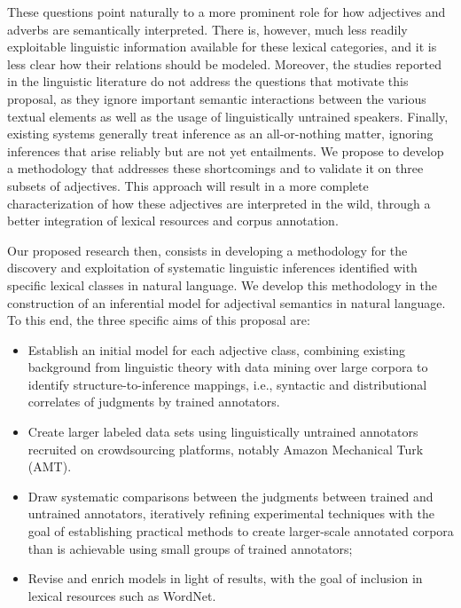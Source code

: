 \documentclass[10pt]{article}
\newcommand{\moveup}{\vspace*{-1.8mm}}
\begin{document}
These questions point naturally to a more prominent role for how adjectives and adverbs are semantically interpreted. There is, however, much less readily exploitable linguistic information available for these lexical categories, and it is less clear how their relations should be modeled. 
Moreover, the studies reported in the linguistic literature do not address the questions that motivate this proposal, as they ignore important semantic interactions 
between the various textual elements as well as the usage of linguistically untrained  speakers. 
Finally, existing systems generally treat inference as an all-or-nothing matter, ignoring inferences that arise reliably but are not yet entailments.
We propose to develop a methodology that addresses these shortcomings and to validate it on three subsets of adjectives.
This approach will result in a more complete characterization of how  these adjectives are interpreted in the wild, through a better integration of lexical resources   and corpus annotation. 
 
Our proposed research then, consists  in developing a methodology for the discovery and exploitation of systematic linguistic inferences identified with specific lexical classes in natural language. We develop this methodology in the construction of an inferential model for adjectival semantics in natural language. To this end, the three specific aims of this proposal are:


\begin{itemize}

\moveup
\item Establish an initial model for each adjective class, combining existing background from linguistic theory with data mining over large corpora to identify structure-to-inference mappings, i.e., syntactic and distributional correlates of judgments by trained annotators.
\moveup
\item Create larger labeled data sets using linguistically untrained annotators recruited on crowdsourcing platforms, notably Amazon Mechanical Turk (AMT).
\moveup 
\item Draw systematic comparisons between the judgments between trained and untrained annotators, iteratively refining experimental techniques with the goal of establishing practical methods to create larger-scale annotated corpora than is achievable using small groups of trained annotators; 
\moveup
\item Revise and enrich models in light of results, with the goal of inclusion in lexical resources such as WordNet.  
\end{itemize}
\moveup
\end{document}
